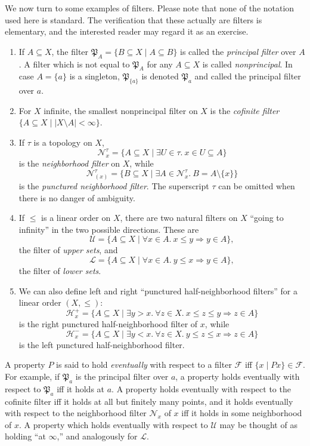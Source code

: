 \documentclass[leqno]{article}
\theoremstyle{definition}
\newcommand{\bldset}[2]{\{{#1}\mid{#2}\}}
\begin{document}
We now turn to some examples of filters. Please note that none of the notation used here is standard. The verification that these actually are filters is elementary, and the interested reader may regard it as an exercise.
\begin{enumerate}
\item If $A \subseteq X$, the filter $\mathfrak P_A = \bldset{B \subseteq X}{A \subseteq B}$ is called the {\em principal filter} over $A$. A filter which is not equal to $\mathfrak P_A$ for any $A \subseteq X$ is called {\em nonprincipal}. In case $A = \{a\}$ is a singleton, $\mathfrak P_{\{a\}}$ is denoted $\mathfrak P_a$ and called the principal filter over $a$.
\item For $X$ infinite, the smallest nonprincipal filter on $X$ is the {\em cofinite filter} $\bldset{A \subseteq X}{|X \setminus A| < \infty}$.
\item If $\tau$ is a topology on $X$,
\[ \mathcal N_x^\tau = \bldset{A \subseteq X}{\exists U \in \tau. \ x \in U \subseteq A} \]
is the {\em neighborhood filter} on $X$, while
\[ \mathcal N_{(x)}^\tau = \bldset{B \subseteq X}{\exists A \in \mathcal N_x^\tau. \ B = A \setminus \{x\}} \]
is the {\em punctured neighborhood filter}. The superscript $\tau$ can be omitted when there is no danger of ambiguity.
\item If $\le$ is a linear order on $X$, there are two natural filters on $X$ ``going to infinity'' in the two possible directions. These are
\[ \mathcal U = \bldset{A \subseteq X}{\forall x \in A. \ x \le y \Longrightarrow y \in A}, \]
the filter of {\em upper sets}, and
\[ \mathcal L = \bldset{A \subseteq X}{\forall x \in A. \ y \le x \Longrightarrow y \in A}, \]
the filter of {\em lower sets}.
\item We can also define left and right ``punctured half-neighborhood filters'' for a linear order $(X,\le)$:
\[ \mathcal H_x^+ = \bldset{A \subseteq X}{\exists y > x. \ \forall z \in X. \ x \le z \le y \Longrightarrow z \in A} \]
is the right punctured half-neighborhood filter of $x$, while
\[ \mathcal H_x^- = \bldset{A \subseteq X}{\exists y < x. \ \forall z \in X. \ y \le z \le x \Longrightarrow z \in A} \]
is the left punctured half-neighborhood filter.
\end{enumerate}

A property $P$ is said to hold {\em eventually} with respect to a filter $\mathcal F$ iff \linebreak $\bldset{x}{Px} \in \mathcal F$. For example, if $\mathfrak P_a$ is the principal filter over $a$, a property holds eventually with respect to $\mathfrak P_a$ iff it holds at $a$. A property holds eventually with respect to the cofinite filter iff it holds at all but finitely many points, and it holds eventually with respect to the neighborhood filter $\mathcal N_x$ of $x$ iff it holds in some neighborhood of $x$. A property which holds eventually with respect to $\mathcal U$ may be thought of as holding ``at $\infty$,'' and analogously for $\mathcal L$.
\end{document}
